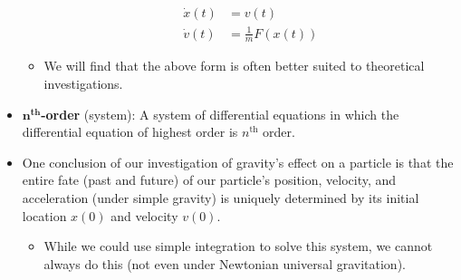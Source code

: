 \documentclass[../notes.tex]{subfiles}
\begin{document}
\begin{itemize}
\begin{itemize}
        \begin{align*}
            \dot{x}(t) &= v(t)\\
            \dot{v}(t) &= \frac{1}{m}F(x(t))
        \end{align*}
        \item We will find that the above form is often better suited to theoretical investigations.
    \end{itemize}
    \item \textbf{$\bm{n}^\textbf{th}$-order} (system): A system of differential equations in which the differential equation of highest order is $n^\text{th}$ order.
    \item One conclusion of our investigation of gravity's effect on a particle is that the entire fate (past and future) of our particle's position, velocity, and acceleration (under simple gravity) is uniquely determined by its initial location $x(0)$ and velocity $v(0)$.
    \begin{itemize}
        \item While we could use simple integration to solve this system, we cannot always do this (not even under Newtonian universal gravitation).
    \end{itemize}
\end{itemize}
\end{document}
